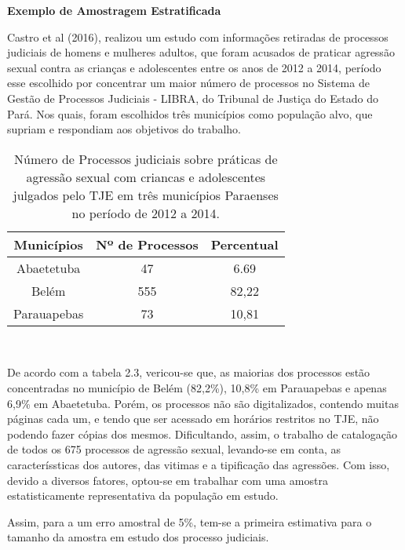 \textbf{Exemplo de Amostragem Estratificada}
\vskip0.3cm

Castro et al (2016), realizou um estudo com informações retiradas de processos
judiciais de homens e mulheres adultos, que foram acusados de praticar agressão
sexual contra as crianças e adolescentes entre os anos de 2012 a 2014, período esse
escolhido por concentrar um maior número de processos no Sistema de Gestão de
Processos Judiciais - LIBRA, do Tribunal de Justiça do Estado do Pará. Nos quais,
foram escolhidos três municípios como população alvo, que supriam e respondiam aos objetivos do trabalho.

\begin{table}[!htb]
    \centering
    {
    \caption{Número de Processos judiciais sobre práticas de agressão sexual com criancas e
adolescentes julgados pelo TJE em três municípios Paraenses no período de 2012 a 2014.}
    \label{amostras estratificada}
    \vspace{0.1cm}
\begin{tabular}{c|c|c}
  \hline\hline
  Municípios   & Nº de Processos &  Percentual \\
  \hline\hline
   Abaetetuba  & 47              & 6.69        \\
   Belém       & 555             & 82,22       \\
   Parauapebas & 73              & 10,81       \\
  \hline\hline
\end{tabular}}
\\
\hspace{-1.0cm}
\end{table}

De acordo com a tabela 2.3, vericou-se que, as maiorias dos processos estão
concentradas no município de Belém (82,2\%), 10,8\% em Parauapebas e apenas 6,9\%
em Abaetetuba. Porém, os processos não são digitalizados, contendo muitas páginas
cada um, e tendo que ser acessado em horários restritos no TJE, não podendo fazer
cópias dos mesmos. Dificultando, assim, o trabalho de catalogação de todos os 675
processos de agressão sexual, levando-se em conta, as caracteríssticas dos autores, das
vitimas e a tipificação das agressões. Com isso, devido a diversos fatores, optou-se
em trabalhar com uma amostra estatisticamente representativa da população em estudo.
\vskip0.3cm

Assim, para a um erro amostral de 5\%, tem-se a primeira estimativa para o tamanho da amostra em estudo dos processo judiciais.

